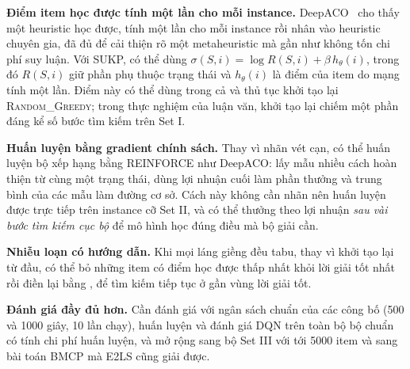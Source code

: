 \textbf{Điểm item học được tính một lần cho mỗi instance.} DeepACO~\cite{Ye2023DeepACO} cho thấy một heuristic học được, tính một lần cho mỗi instance rồi nhân vào heuristic chuyên gia, đã đủ để cải thiện rõ một metaheuristic mà gần như không tốn chi phí suy luận. Với SUKP, có thể dùng $\sigma(S,i)=\log R(S,i)+\beta\,h_\theta(i)$, trong đó $R(S,i)$ giữ phần phụ thuộc trạng thái và $h_\theta(i)$ là điểm của item do mạng tính một lần. Điểm này có thể dùng trong cả \addstar và thủ tục khởi tạo lại \textsc{Random\_Greedy}; trong thực nghiệm của luận văn, khởi tạo lại chiếm một phần đáng kể số bước tìm kiếm trên Set I.

\textbf{Huấn luyện bằng gradient chính sách.} Thay vì nhãn vét cạn, có thể huấn luyện bộ xếp hạng bằng REINFORCE như DeepACO: lấy mẫu nhiều cách hoàn thiện \addstar từ cùng một trạng thái, dùng lợi nhuận cuối làm phần thưởng và trung bình của các mẫu làm đường cơ sở. Cách này không cần nhãn nên huấn luyện được trực tiếp trên instance cỡ Set II, và có thể thưởng theo lợi nhuận \emph{sau vài bước tìm kiếm cục bộ} để mô hình học đúng điều mà bộ giải cần.

\textbf{Nhiễu loạn có hướng dẫn.} Khi mọi láng giềng đều tabu, thay vì khởi tạo lại từ đầu, có thể bỏ những item có điểm học được thấp nhất khỏi lời giải tốt nhất rồi điền lại bằng \addstar, để tìm kiếm tiếp tục ở gần vùng lời giải tốt.

\textbf{Đánh giá đầy đủ hơn.} Cần đánh giá với ngân sách chuẩn của các công bố (500 và 1000 giây, 10 lần chạy), huấn luyện và đánh giá DQN trên toàn bộ bộ chuẩn có tính chi phí huấn luyện, và mở rộng sang bộ Set III với tới 5000 item và sang bài toán BMCP mà E2LS cũng giải được.

